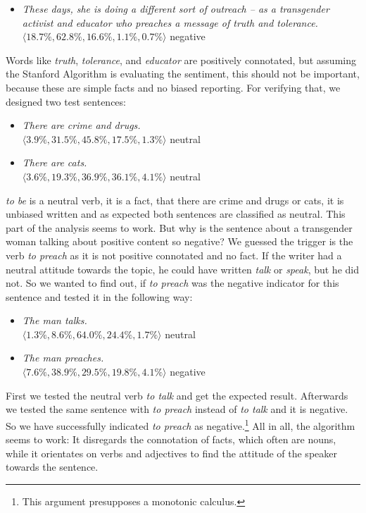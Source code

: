 \documentclass[10pt,a4paper,twocolumn]{scrartcl}
\begin{document}
\begin{itemize}
\item[ ] \textit{These days, she is doing a different sort of outreach -- as a transgender activist and educator who preaches a message of truth and tolerance.}\\
$\langle 18.7\%,62.8\%,16.6\%,1.1\%,0.7\%\rangle$ \hfill negative
\end{itemize}


Words like \textit{truth}, \textit{tolerance}, and \textit{educator} are positively connotated, but assuming the Stanford Algorithm is evaluating the sentiment, this should not be important, because these are simple facts and no biased reporting. For verifying that, we designed two test sentences:

\begin{itemize}
\item[ ] \textit{There are crime and drugs.}\\
$\langle 3.9\%, 31.5\%, 45.8\%, 17.5\%, 1.3\%\rangle$ \hfill neutral
\item[ ]\textit{There are cats.}\\
$\langle 3.6\%, 19.3\%, 36.9\%, 36.1\%, 4.1\%\rangle$ \hfill neutral
\end{itemize}

\textit{to be} is a neutral verb, it is a fact, that there are crime and drugs or cats, it is unbiased written and as expected both sentences are classified as neutral. This part of the analysis seems to work. But why is the sentence about a transgender woman talking about positive content so negative? We guessed the trigger is the verb \textit{to preach} as it is not positive connotated and no fact. If the writer had a neutral attitude towards the topic, he could have written \textit{talk} or \textit{speak}, but he did not. So we wanted to find out, if \textit{to preach} was the negative indicator for this sentence and tested it in the following way:

\begin{itemize}
\item[ ] \textit{The man talks.}\\
$\langle 1.3\%, 8.6\%, 64.0\%, 24.4\%, 1.7\%\rangle$ \hfill neutral
\item[ ] \textit{The man preaches.}\\
$\langle 7.6\%, 38.9\%, 29.5\%, 19.8\%, 4.1\%\rangle$ \hfill negative
\end{itemize}

First we tested the neutral verb \textit{to talk} and get the expected result. Afterwards we tested the same sentence with \textit{to preach} instead of \textit{to talk} and it is negative. So we have successfully indicated \textit{to preach} as negative.\footnote{This argument presupposes a monotonic calculus.} All in all, the algorithm seems to work: It disregards the connotation of facts, which often are nouns, while it orientates on verbs and adjectives to find the attitude of the speaker towards the sentence.
\end{document}

